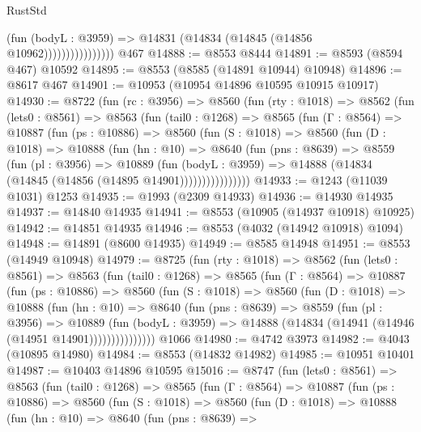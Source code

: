 \begin{lexlean}{RustStd}
\begin{coremodule}
                            (fun (bodyL : @3959) =>
                            @14831 (@14834 (@14845 (@14856 @10962))))))))))))))))
    @467
@14888 := @8553 @8444
@14891 := @8593 (@8594 @467) @10592
@14895 := @8553 (@8585 (@14891 @10944) @10948)
@14896 := @8617 @467
@14901 := @10953 (@10954 @14896 @10595 @10915 @10917)
@14930 := @8722
    (fun (rc : @3956) =>
    @8560
      (fun (rty : @1018) =>
      @8562
        (fun (lets0 : @8561) =>
        @8563
          (fun (tail0 : @1268) =>
          @8565
            (fun (Γ : @8564) =>
            @10887
              (fun (ps : @10886) =>
              @8560
                (fun (S : @1018) =>
                @8560
                  (fun (D : @1018) =>
                  @10888
                    (fun (hn : @10) =>
                    @8640
                      (fun (pns : @8639) =>
                      @8559
                        (fun (pl : @3956) =>
                        @10889
                          (fun (bodyL : @3959) =>
                          @14888 (@14834 (@14845 (@14856 (@14895 @14901))))))))))))))))
@14933 := @1243 (@11039 @1031) @1253
@14935 := @1993 (@2309 @14933)
@14936 := @14930 @14935
@14937 := @14840 @14935
@14941 := @8553 (@10905 (@14937 @10918) @10925)
@14942 := @14851 @14935
@14946 := @8553 (@4032 (@14942 @10918) @1094)
@14948 := @14891 (@8600 @14935)
@14949 := @8585 @14948
@14951 := @8553 (@14949 @10948)
@14979 := @8725
    (fun (rty : @1018) =>
    @8562
      (fun (lets0 : @8561) =>
      @8563
        (fun (tail0 : @1268) =>
        @8565
          (fun (Γ : @8564) =>
          @10887
            (fun (ps : @10886) =>
            @8560
              (fun (S : @1018) =>
              @8560
                (fun (D : @1018) =>
                @10888
                  (fun (hn : @10) =>
                  @8640
                    (fun (pns : @8639) =>
                    @8559
                      (fun (pl : @3956) =>
                      @10889
                        (fun (bodyL : @3959) =>
                        @14888 (@14834 (@14941 (@14946 (@14951 @14901)))))))))))))))
    @1066
@14980 := @4742 @3973
@14982 := @4043 (@10895 @14980)
@14984 := @8553 (@14832 @14982)
@14985 := @10951 @10401
@14987 := @10403 @14896 @10595
@15016 := @8747
    (fun (lets0 : @8561) =>
    @8563
      (fun (tail0 : @1268) =>
      @8565
        (fun (Γ : @8564) =>
        @10887
          (fun (ps : @10886) =>
          @8560
            (fun (S : @1018) =>
            @8560
              (fun (D : @1018) =>
              @10888
                (fun (hn : @10) =>
                @8640
                  (fun (pns : @8639) =>

\end{coremodule}
\end{lexlean}
